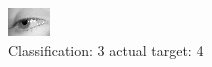\begin{figure}[h!]
\begin{center}
\includegraphics[width=0.60\columnwidth]{figures/ID2977_class_3_target_4.png}
\end{center}
\caption{ Classification: 3 actual target: 4}
\label{fig:ID2977_class_3_target_4}
\end{figure}
